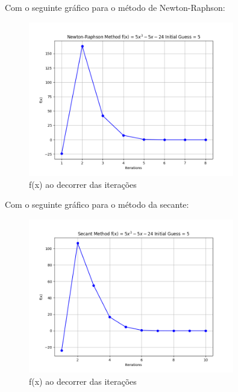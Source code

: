 \documentclass[12pt, a4paper]{article} %
\begin{document}
            Com o seguinte gr\'afico para o m\'etodo de Newton-Raphson:
            \begin{figure}[H]
                \centering
                \includegraphics[width=0.8\textwidth]{../images/grafic-ex-2.2-newton-raphson-method-5.png}
                \caption{f(x) ao decorrer das itera\c{c}\~oes}
            \end{figure}
            Com o seguinte gr\'afico para o m\'etodo da secante:
            \begin{figure}[H]
                \centering
                \includegraphics[width=0.8\textwidth]{../images/grafic-ex-2.2-secant-method-5.png}
                \caption{f(x) ao decorrer das itera\c{c}\~oes}
            \end{figure}
\end{document}
